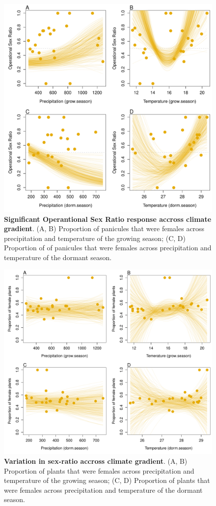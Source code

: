 \documentclass[12pt]{article}\usepackage[]{graphicx}\usepackage[dvipsnames]{xcolor}
\begin{document}
\begin{figure}[H]
	\begin{center}
		\includegraphics[width=0.80\linewidth]{Figures/gardens_OSR.pdf}
		\caption{\textbf{Significant Operantional Sex Ratio response accross climate gradient}.
			(A, B) Proportion of panicules that were females across precipitation and temperature of the growing season; (C, D) Proportion of of panicules that were females across precipitation and temperature of the dormant season.}
		\label{Sup:gardens_OSR}
	\end{center}
\end{figure}

\begin{figure}[H]
	\begin{center}
		\includegraphics[width=0.95\linewidth]{Figures/gardens_SR.pdf}
		\caption{\textbf{Variation in sex-ratio accross climate gradient}.
			(A, B) Proportion of plants that were females across precipitation and temperature of the growing season; (C, D) Proportion of plants that were females across precipitation and temperature of the dormant season.}
		\label{Sup:gardens_SR}
	\end{center}
\end{figure}
\end{document}
